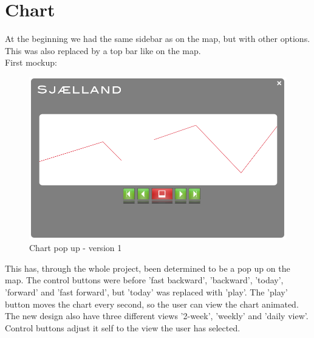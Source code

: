\section{Chart}
At the beginning we had the same sidebar as on the map, but with other options. This was also replaced by a top bar like on the map.\\
First mockup:\\ 
\begin{figure}[hbtp]
\includegraphics[scale=.5]{../figure/design_chart_v1.png} 
\caption{Chart pop up - version 1}
\end{figure}
This has, through the whole project, been determined to be a pop up on the map.
The control buttons were before 'fast backward', 'backward', 'today', 'forward' and 'fast forward', but 'today' was replaced with 'play'. The 'play' button moves the chart every second, so the user can view the chart animated.\\
The new design also have three different views '2-week', 'weekly' and 'daily view'. Control buttons adjust it self to the view the user has selected.